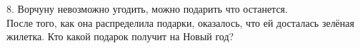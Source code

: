 8. Ворчуну невозможно угодить, можно подарить что останется.\\
После того, как она распределила подарки, оказалось, что ей досталась зелёная жилетка. Кто какой подарок получит на Новый год?\\
